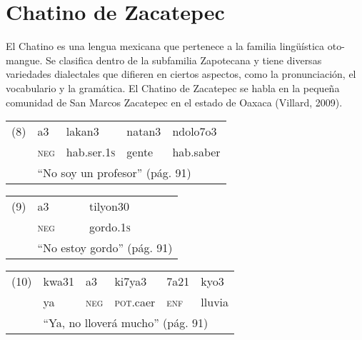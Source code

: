 \section*{Chatino de Zacatepec}

\noindent El Chatino es una lengua mexicana que pertenece a la familia lingüística oto-mangue. Se clasifica dentro de la subfamilia Zapotecana y tiene diversas variedades dialectales que difieren en ciertos aspectos, como la pronunciación, el vocabulario y la gramática. El Chatino de Zacatepec se habla en la pequeña comunidad de San Marcos Zacatepec en el estado de Oaxaca (Villard, 2009). \vspace{1cm}

{\setmainfont{Doulos SIL}
    \begin{tabular}{lllll}
        (8) & a3                                                 & lakan3              & natan3 & ndolo7o3  \\
            & \textsc{neg}                                       & hab.ser.\textsc{1s} & gente  & hab.saber \\
            & \multicolumn{4}{l}{“No soy un profesor” (pág. 91)}                                            \\
    \end{tabular}
    \vspace{0.5cm}

    \begin{tabular}{lll}
        (9) & a3                                             & tilyon30          \\
            & \textsc{neg}                                   & gordo.\textsc{1s} \\
            & \multicolumn{2}{l}{“No estoy gordo” (pág. 91)}                     \\
    \end{tabular}
    \vspace{0.5cm}

    \begin{tabular}{llllll}
        (10) & kwa31                                                & a3           & ki7ya3            & 7a21         & kyo3   \\
             & ya                                                   & \textsc{neg} & \textsc{pot}.caer & \textsc{enf} & lluvia \\
             & \multicolumn{5}{l}{“Ya, no lloverá mucho” (pág. 91)}                                                            \\
    \end{tabular}
} \vspace{1cm}

